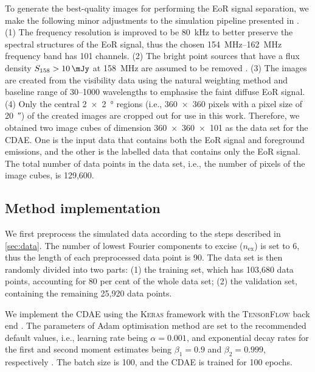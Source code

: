 \documentclass[letters,a4paper,fleqn,usenatbib]{mnras}
\newcommand{\R}[1]{\mathrm{#1}}
\begin{document}
To generate the best-quality images for performing the EoR signal
separation, we make the following minor adjustments to the simulation
pipeline presented in \citet{li2018}.
(1) The frequency resolution is improved to be \SI{80}{\kHz} to better
preserve the spectral structures of the EoR signal, thus the chosen
\SIrange{154}{162}{\MHz} frequency band has 101 channels.
(2) The bright point sources that have a flux density
$S_{158} > \SI{10}{\mJy}$ at \SI{158}{\MHz} are assumed to be
removed \citep[e.g.,][]{liu2009ps}.
(3) The images are created from the visibility data using the natural
weighting method and baseline range of \numrange{30}{1000} wavelengths
to emphasise the faint diffuse EoR signal.
(4) Only the central \SI[product-units=repeat]{2 x 2}{\degree} regions
(i.e., \num{360 x 360} pixels with a pixel size of \SI{20}{\arcsecond})
of the created images are cropped out for use in this work.
Therefore, we obtained two image cubes of dimension \num{360 x 360 x 101}
as the data set for the CDAE.
One is the input data that contains both the EoR signal and foreground
emissions, and the other is the labelled data that contains only the
EoR signal.
The total number of data points in the data set, i.e., the number of
pixels of the image cubes, is 129,600.


\subsection{Method implementation}
\label{sec:implementation}

We first preprocess the simulated data according to the steps described
in \autoref{sec:data}.
The number of lowest Fourier components to excise ($n_{\R{ex}}$) is
set to 6, thus the length of each preprocessed data point is 90.
The data set is then randomly divided into two parts:
(1) the training set, which has 103,680 data points, accounting for
80 per cent of the whole data set;
(2) the validation set, containing the remaining 25,920 data points.

We implement the CDAE using the \textsc{Keras} framework \citep{keras}
with the \textsc{TensorFlow} back end \citep{tensorflow}.
The parameters of Adam optimisation method are set to the recommended
default values, i.e., learning rate being $\alpha = 0.001$, and
exponential decay rates for the first and second moment estimates being
$\beta_1 = 0.9$ and $\beta_2 = 0.999$, respectively \citep{kingma2015}.
The batch size is 100, and the CDAE is trained for 100 epochs.
\end{document}
